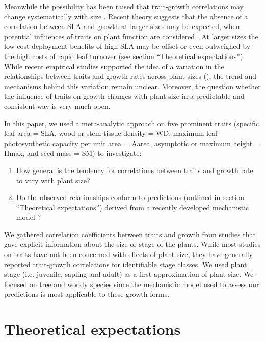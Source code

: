 \documentclass[a4paper,11pt]{article}
\begin{document}
Meanwhile the possibility has been raised that trait-growth correlations may change systematically with size \citep{Falster:2011ii, Ruger:2012jv, Iida:2014ep, Iida:2014hq}. Recent theory suggests that the absence of a correlation between SLA and growth at larger sizes may be expected, when potential influences of traits on plant function are considered \citep{Falster:2011ii}. At larger sizes the low-cost deployment benefits of high SLA may be offset or even outweighed by the high costs of rapid leaf turnover (see section ``Theoretical expectations''). While recent empirical studies supported the idea of a variation in the relationships between traits and growth rates across plant sizes (\citealt{Iida:2014ep, Iida:2014hq}), the trend and mechanisms behind this variation remain unclear. Moreover, the question whether the influence of traits on growth changes with plant size in a predictable and consistent way is very much open.

In this paper, we used a meta-analytic approach on five prominent traits (specific leaf area = SLA, wood or stem tissue density = WD, maximum leaf photosynthetic capacity per unit area = Aarea, asymptotic or maximum height = Hmax, and seed mass = SM) to investigate:
\begin{enumerate}
  \item How general is the tendency for correlations between traits and growth rate to vary with plant size?
  \item  Do the observed relationships conform to predictions (outlined in section ``Theoretical expectations'') derived from a recently developed mechanistic model \citep{Falster:2011ii}?
\end{enumerate}
We gathered correlation coefficients between traits and growth from studies that gave explicit information about the size or stage of the plants. While most studies on traits have not been concerned with effects of plant size, they have generally reported trait-growth correlations for identifiable stage classes. We used plant stage (i.e. juvenile, sapling and adult) as a first approximation of plant size. We focused on tree and woody species since the mechanistic model used to assess our predictions is most applicable to these growth forms.

\section*{Theoretical expectations}\label{theory}
\end{document}
